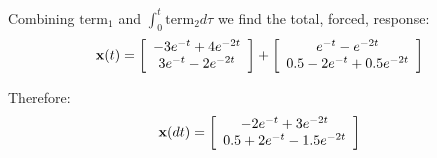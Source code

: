Combining $\mathrm{term}_1$ and $\int_0^t \mathrm{term}_2 d\tau$ we find the total, forced, response:
\[
{\bf{x}}(t) = \left[ {\begin{array}{*{20}c}
   { - 3e^{ - t}  + 4e^{ - 2t} }  \\
   {3e^{ - t}  - 2e^{ - 2t} }  \\
\end{array}} \right] + \left[ {\begin{array}{*{20}c}
   {e^{ - t}  - e^{ - 2t} }  \\
   {0.5 - 2e^{ - t}  + 0.5e^{ - 2t} }  \\
\end{array}} \right]
\]

Therefore:
\[
{\bf{x}}(dt) = \left[ {\begin{array}{*{20}c}
   { - 2e^{ - t}  + 3e^{ - 2t} }  \\
   {0.5 + 2e^{ - t}  - 1.5e^{ - 2t} }  \\
\end{array}} \right]
\]


